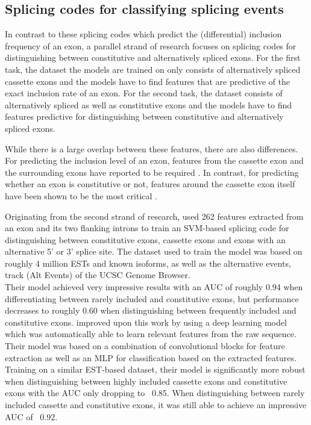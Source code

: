 \subsection{Splicing codes for classifying splicing events}
In contrast to these splicing codes which predict the (differential) inclusion frequency of an exon, a parallel strand of research focuses on splicing codes for distinguishing between constitutive and alternatively spliced exons. 
For the first task, the dataset the models are trained on only consists of alternatively spliced cassette exons and the models have to find features that are predictive of the exact inclusion rate of an exon. For the second task, the dataset consists of alternatively spliced as well as constitutive exons and the models have to find features predictive for distinguishing between constitutive and alternatively spliced exons.

While there is a large overlap between these features, there are also differences.
For predicting the inclusion level of an exon, features from the cassette exon and the surrounding exons have reported to be required \cite{splicingcodegood1}. In contrast, for predicting whether an exon is constitutive or not, features around the cassette exon itself have been shown to be the most critical \cite{featurearoundexonjunc}. 

Originating from the second strand of research, \cite{buschhertel} used 262 features extracted from an exon and its two flanking introns to train an SVM-based splicing code for distinguishing between constitutive exons, cassette exons and exons with an alternative 5' or 3' splice site. The dataset used to train the model was based on roughly 4 million ESTs and known isoforms, as well as the alternative events, track (Alt Events) of the UCSC Genome Browser.\\
Their model achieved very impressive results with an AUC of roughly 0.94 when differentiating between rarely included and constitutive exons, but performance decreases to roughly 0.60 when distinguishing between frequently included and constitutive exons. \cite{dsc} improved upon this work by using a deep learning model which was automatically able to learn relevant features from the raw sequence. Their model was based on a combination of convolutional blocks for feature extraction as well as an MLP for classification based on the extracted features. Training on a similar EST-based dataset, their model is significantly more robust when distinguishing between highly included cassette exons and constitutive exons with the AUC only dropping to ~0.85. When distinguishing between rarely included cassette and constitutive exons, it was still able to achieve an impressive AUC of ~0.92.
